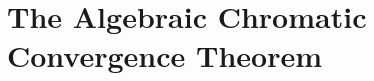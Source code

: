 \section{The Algebraic Chromatic Convergence Theorem}\label{sec:chromatic-geometry-algebraicconvergence}
